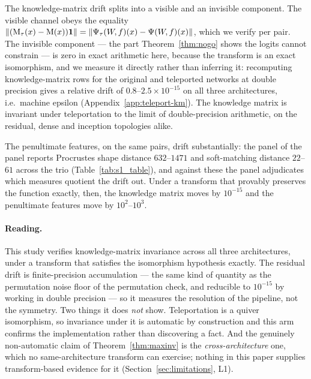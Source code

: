 The knowledge-matrix drift splits into a visible and an invisible component. The
visible channel obeys the equality
$\|(\mathrm{M}_\tau(x)-\mathrm{M}(x))\mathbf 1\|=\|\Psi_\tau(W\!,f)(x)-\Psi(W\!,f)(x)\|$, which we verify
per pair. The invisible component --- the part Theorem~\ref{thm:nogo} shows the
logits cannot constrain --- is zero in exact arithmetic here, because the
transform is an exact isomorphism, and we measure it directly rather than
inferring it: recomputing knowledge-matrix rows for the original and teleported
networks at double precision gives a relative drift of
$0.8$--$2.5\times10^{-15}$ on all three architectures, i.e.\ machine epsilon
(Appendix~\ref{app:teleport-km}). The knowledge matrix is invariant under
teleportation to the limit of double-precision arithmetic, on the residual, dense
and inception topologies alike.

The penultimate features, on the same pairs, drift substantially: the panel of
the panel reports Procrustes shape distance $632$--$1471$ and soft-matching
distance $22$--$61$ across the trio (Table~\ref{tab:s1_table}), and against these
the panel adjudicates which measures quotient the drift out. Under a transform
that provably preserves the function exactly, then, the knowledge matrix moves by
$10^{-15}$ and the penultimate features move by $10^{2}$--$10^{3}$.

\paragraph{Reading.}
This study verifies knowledge-matrix invariance across all three architectures,
under a transform that satisfies the isomorphism hypothesis exactly. The residual
drift is finite-precision accumulation --- the same kind of quantity as the
permutation noise floor of the permutation check, and reducible to $10^{-15}$ by working in
double precision --- so it measures the resolution of the pipeline, not the
symmetry. Two things it does \emph{not} show. Teleportation is a quiver
isomorphism, so invariance under it is automatic by construction and this arm
confirms the implementation rather than discovering a fact. And the genuinely
non-automatic claim of Theorem~\ref{thm:maxinv} is the \emph{cross-architecture}
one, which no same-architecture transform can exercise; nothing in this paper
supplies transform-based evidence for it (Section~\ref{sec:limitations}, L1).

